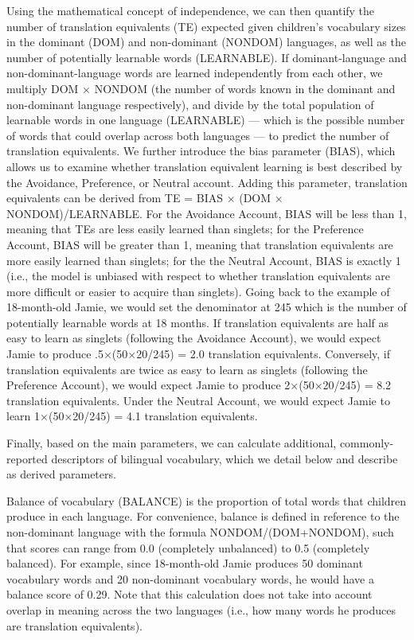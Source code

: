 \documentclass[
  english,
  ,man,floatsintext]{apa6}
\begin{document}
Using the mathematical concept of independence, we can then quantify the number of translation equivalents (TE) expected given children's vocabulary sizes in the dominant (DOM) and non-dominant (NONDOM) languages, as well as the number of potentially learnable words (LEARNABLE). If dominant-language and non-dominant-language words are learned independently from each other, we multiply DOM × NONDOM (the number of words known in the dominant and non-dominant language respectively), and divide by the total population of learnable words in one language (LEARNABLE) --- which is the possible number of words that could overlap across both languages --- to predict the number of translation equivalents.
We further introduce the bias parameter (BIAS), which allows us to examine whether translation equivalent learning is best described by the Avoidance, Preference, or Neutral account. Adding this parameter, translation equivalents can be derived from TE = BIAS × (DOM × NONDOM)/LEARNABLE. For the Avoidance Account, BIAS will be less than 1, meaning that TEs are less easily learned than singlets; for the Preference Account, BIAS will be greater than 1, meaning that translation equivalents are more easily learned than singlets; for the the Neutral Account, BIAS is exactly 1 (i.e., the model is unbiased with respect to whether translation equivalents are more difficult or easier to acquire than singlets). Going back to the example of 18-month-old Jamie, we would set the denominator at 245 which is the number of potentially learnable words at 18 months. If translation equivalents are half as easy to learn as singlets (following the Avoidance Account), we would expect Jamie to produce .5×(50×20/245) = 2.0 translation equivalents. Conversely, if translation equivalents are twice as easy to learn as singlets (following the Preference Account), we would expect Jamie to produce 2×(50×20/245) = 8.2 translation equivalents. Under the Neutral Account, we would expect Jamie to learn 1×(50×20/245) = 4.1 translation equivalents.

Finally, based on the main parameters, we can calculate additional, commonly-reported descriptors of bilingual vocabulary, which we detail below and describe as derived parameters.

Balance of vocabulary (BALANCE) is the proportion of total words that children produce in each language. For convenience, balance is defined in reference to the non-dominant language with the formula NONDOM/(DOM+NONDOM), such that scores can range from 0.0 (completely unbalanced) to 0.5 (completely balanced). For example, since 18-month-old Jamie produces 50 dominant vocabulary words and 20 non-dominant vocabulary words, he would have a balance score of 0.29. Note that this calculation does not take into account overlap in meaning across the two languages (i.e., how many words he produces are translation equivalents).
\end{document}

